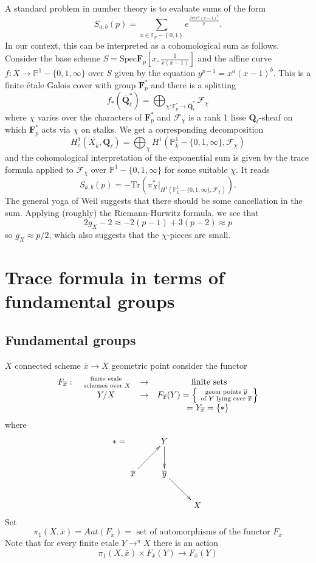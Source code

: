 A standard problem in number theory is to evaluate sums of the form
$$
S_{a,b}(p) = \sum_{x\in \mathbb F_p-\left\{0, 1\right\}} e^{\frac{2\pi ix^a(x-1)^b}{p}}.
$$
In our context, this can be interpreted as a cohomological sum as follows. Consider the base scheme $S = \text{Spec} \mathbf{F}_p\left[x, \frac{1}{x(x-1)}\right]$ and the affine curve $f: X \to \mathbb P^1-\{0, 1, \infty\}$ over $S$ given by the equation $y^{p-1} = x^a(x-1)^b$. This is a finite \'etale Galois cover with group $\mathbf{F}_p^*$ and there is a splitting
$$
f_*(\bar{\mathbf{Q}}_\ell^*) =
\bigoplus_{\chi : \mathbb F_p^*\to \bar{\mathbf{Q}}_\ell^*} \mathcal{F}_\chi
$$
where $\chi$ varies over the characters of $\mathbf{F}_p^*$ and $\mathcal{F}_\chi$ is a rank 1 lisse $\mathbf{Q}_\ell$-sheaf on which $\mathbf{F}_p^*$ acts via $\chi$ on stalks. We get a corresponding decomposition
$$
H_c^1(X_{\bar k}, \mathbf{Q}_\ell) = \bigoplus_\chi H^1(\mathbb P_{\bar k}^1-\{0, 1, \infty\}, \mathcal{F}_\chi)
$$
and the cohomological interpretation of the exponential sum is given by the trace formula applied to $\mathcal{F}_\chi$ over $\mathbb P^1 - \{0, 1, \infty\}$ for some suitable $\chi$. It reads
$$
S_{a,b}(p) = -\text{Tr}\left(\pi_X^*\big|_{H^1(\mathbb P_{\bar k}^1-\{0, 1, \infty\}, \mathcal{F}_\chi)}\right).
$$
The general yoga of Weil suggests that there should be some cancellation in the sum. Applying (roughly) the Riemann-Hurwitz formula, we see that
$$
2g_X-2 \approx -2 (p-1) + 3(p-2) \approx p
$$
so $g_X\approx p/2$, which also suggests that the $\chi$-pieces are small.




\section*{Trace formula in terms of fundamental groups}
\subsection{Fundamental groups} $X$ connected scheme $\overline x\to X$ geometric point consider the functor 
$$
\begin{array}{ccccccc}
F_{\overline x}: &
\text{ finite etale }\atop \text{ schemes over } X &
\to & \text{ finite sets} \\
&
Y/X &
\to &
F_{\overline x}(Y) =
\left\{\text{ geom points }\overline y\atop \text{ of } Y
\text{ lying over }\overline x\right\} \\
&
&
&
= Y_{\overline x} = \left\{ * \right\}
\end{array}
$$
where 
$$
* =
\xymatrix{
 &
Y \ar[d] &
\\
\overline x \ar[ur] &
{\overline y} \ar[dr] &
\\
 &
 &
 X
}
$$
Set 
$$
\pi_1(X, \overline x)
=
Aut(F_{\overline x})
=
\text{ set of automorphisms of the functor }F_{\overline x}
$$
	Note that for every finite etale $Y\to^\pi X$ there is an action
		$$\pi_1(X, \overline x) \times F_{\overline x}(Y) \to F_{\overline x}(Y)$$
		
